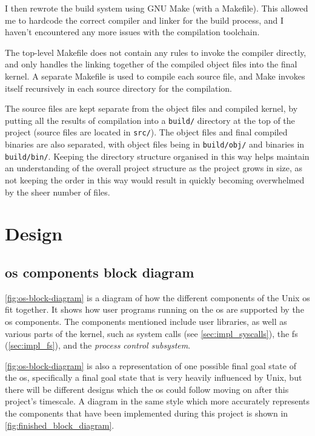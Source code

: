 \documentclass{article}
\begin{document}
I then rewrote the build system using GNU Make (with a Makefile). This allowed
me to hardcode the correct compiler and linker for the build process, and I
haven't encountered any more issues with the compilation toolchain.

The top-level Makefile does not contain any rules to invoke the compiler
directly, and only handles the linking together of the compiled object files
into the final kernel. A separate Makefile is used to compile each source file,
and Make invokes itself recursively in each source directory for the
compilation.

The source files are kept separate from the object files and compiled kernel,
by putting all the results of compilation into a \texttt{build/} directory at
the top of the project (source files are located in \texttt{src/}). The object
files and final compiled binaries are also separated, with object files being
in \texttt{build/obj/} and binaries in \texttt{build/bin/}. Keeping the
directory structure organised in this way helps maintain an understanding of
the overall project structure as the project grows in size, as not keeping the
order in this way would result in quickly becoming overwhelmed by the sheer
number of files.

\section{Design}
\subsection{\texorpdfstring{\gls{os}}{OS} components block diagram}
\autoref{fig:os-block-diagram} is a diagram of how the different components of
the Unix \gls{os} fit together. It shows how user programs running on the
\gls{os} are supported by the \gls{os} components. The components mentioned
include user libraries, as well as various parts of the kernel, such as system
calls (see \autoref{sec:impl_syscalls}), the \gls{fs} (\autoref{sec:impl_fs}),
and the \emph{process control subsystem}.

\autoref{fig:os-block-diagram} is also a representation of one possible final
goal state of the \gls{os}, specifically a final goal state that is very
heavily influenced by Unix, but there will be different designs which the
\gls{os} could follow moving on after this project's timescale. A diagram in
the same style which more accurately represents the components that have been
implemented during this project is shown in
\autoref{fig:finished_block_diagram}.
\end{document}
